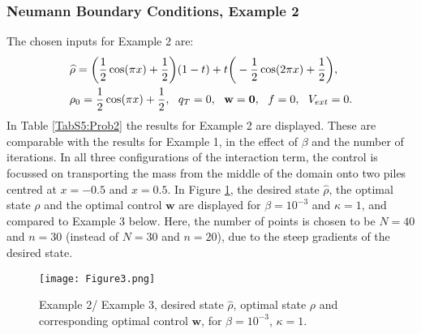 \subsubsection{Neumann Boundary Conditions, Example 2} 
The chosen inputs for Example 2 are:
\begin{align*}
&\widehat \rho = \bigg(\frac{1}{2}\cos(\pi x) + \frac{1}{2}\bigg)(1-t) + t\bigg(-\frac{1}{2}\cos(2 \pi x) + \frac{1}{2}\bigg),\\
&\rho_{0} = \frac{1}{2}\cos(\pi x) + \frac{1}{2},\ \
q_{T} = 0,\ \
\mathbf{w} = \mathbf{0},\ \
f =0,\ \
V_{ext} =0.
\end{align*}
In Table \ref{TabS5:Prob2} the results for Example 2 are displayed. These are comparable with the results for Example 1, in the effect of $\beta$ and the number of iterations. In all three configurations of the interaction term, the control is focussed on transporting the mass from the middle of the domain onto two piles centred at $x=-0.5$ and $x=0.5$. In Figure \ref{Ex22DN1}, the desired state $\widehat \rho$, the optimal state $\rho$ and the optimal control $\mathbf{w}$ are displayed for $\beta = 10^{-3}$ and $\kappa = 1$, and compared to Example 3 below. Here, the number of points is chosen to be $N=40$ and $n=30$ (instead of $N=30$ and $n=20$), due to the steep gradients of the desired state.
\begin{figure}[h]
	\texttt{[image: Figure3.png]}
	\caption{Example 2/ Example 3, desired state $\widehat \rho$, optimal state $\rho$ and corresponding optimal control $\mathbf{w}$, for $\beta = 10^{-3}$, $\kappa= 1$.}
	\label{Ex22DN1}
\end{figure}



